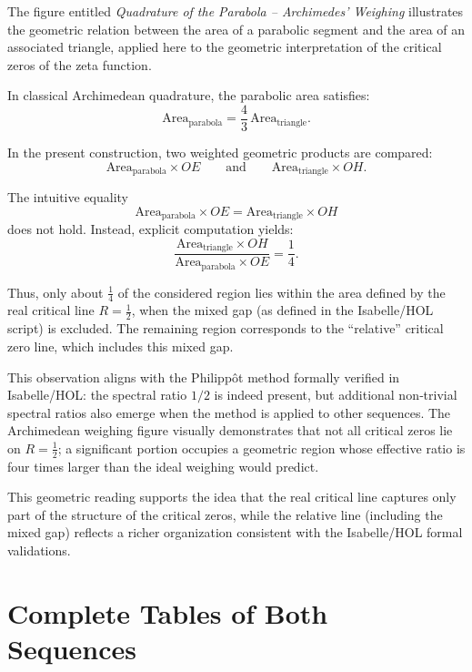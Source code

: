 \documentclass[a4paper,11pt]{article}
\begin{document}
\begin{tcolorbox}[colback=white,colframe=black,title={Parabola quadrature and critical zeros}]
The figure entitled \emph{Quadrature of the Parabola -- Archimedes' Weighing} illustrates
the geometric relation between the area of a parabolic segment and the area of an associated
triangle, applied here to the geometric interpretation of the critical zeros of the zeta function.

In classical Archimedean quadrature, the parabolic area satisfies:
\[
\text{Area}_{\text{parabola}} = \frac{4}{3}\,\text{Area}_{\text{triangle}}.
\]

In the present construction, two weighted geometric products are compared:
\[
\text{Area}_{\text{parabola}} \times OE
\qquad\text{and}\qquad
\text{Area}_{\text{triangle}} \times OH.
\]

The intuitive equality
\[
\text{Area}_{\text{parabola}} \times OE = \text{Area}_{\text{triangle}} \times OH
\]
does not hold. Instead, explicit computation yields:
\[
\frac{\text{Area}_{\text{triangle}} \times OH}{\text{Area}_{\text{parabola}} \times OE}
= \frac{1}{4}.
\]

Thus, only about \(\tfrac{1}{4}\) of the considered region lies within the area defined by the real
critical line \(R = \tfrac{1}{2}\), when the mixed gap (as defined in the Isabelle/HOL script)
is excluded. The remaining region corresponds to the “relative” critical zero line, which
includes this mixed gap.

This observation aligns with the Philippôt method formally verified in Isabelle/HOL:
the spectral ratio \(1/2\) is indeed present, but additional non‑trivial spectral ratios also
emerge when the method is applied to other sequences. The Archimedean weighing figure
visually demonstrates that not all critical zeros lie on \(R = \tfrac{1}{2}\); a significant portion
occupies a geometric region whose effective ratio is four times larger than the ideal weighing
would predict.

This geometric reading supports the idea that the real critical line captures only part of the
structure of the critical zeros, while the relative line (including the mixed gap) reflects a richer
organization consistent with the Isabelle/HOL formal validations.
\end{tcolorbox}

\newpage
\section{Complete Tables of Both Sequences}
\end{document}
